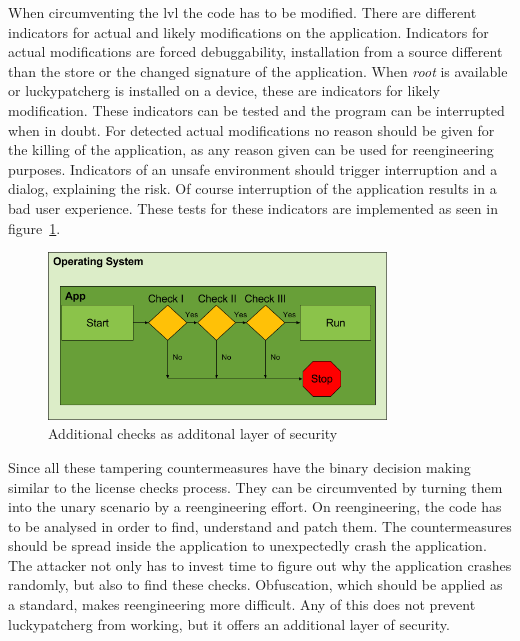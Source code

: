 When circumventing the \gls{lvl} the code has to be modified.
There are different indicators for actual and likely modifications on the application.
Indicators for actual modifications are forced debuggability, installation from a source different than the store or the changed signature of the application.
When \textit{root} is available or \gls{luckypatcherg} is installed on a device, these are indicators for likely modification.
\newline
These indicators can be tested and the program can be interrupted when in doubt.
For detected actual modifications no reason should be given for the killing of the application, as any reason given can be used for reengineering purposes.
Indicators of an unsafe environment should trigger interruption and a dialog, explaining the risk.
Of course interruption of the application results in a bad user experience.
These tests for these indicators are implemented as seen in figure~\ref{fig:verificationNowAdditional}.
\begin{figure}[h]
    \centering
    \includegraphics[width=0.8\textwidth]{data/verificationNowAdditional.png}
    \caption{Additional checks as additonal layer of security}
    \label{fig:verificationNowAdditional}
\end{figure}
\newline
Since all these tampering countermeasures have the binary decision making similar to the license checks process.
They can be circumvented by turning them into the unary scenario by a reengineering effort.
\newline
On reengineering, the code has to be analysed in order to find, understand and patch them.
The countermeasures should be spread inside the application to unexpectedly crash the application.
The attacker not only has to invest time to figure out why the application crashes randomly, but also to find these checks.
Obfuscation, which should be applied as a standard, makes reengineering more difficult.
\newline
Any of this does not prevent \gls{luckypatcherg} from working, but it offers an additional layer of security.
